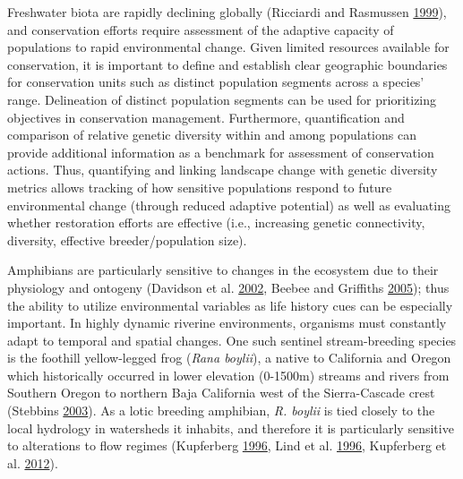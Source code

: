 \documentclass[proquest,12pt,final]{ucthesis-CA2012} %
\begin{document}
\begin{ucmainmatter}
Freshwater biota are rapidly declining globally (Ricciardi and Rasmussen
\protect\hyperlink{ref-ricciardi_extinction_1999}{1999}), and
conservation efforts require assessment of the adaptive capacity of
populations to rapid environmental change. Given limited resources
available for conservation, it is important to define and establish
clear geographic boundaries for conservation units such as distinct
population segments across a species' range. Delineation of distinct
population segments can be used for prioritizing objectives in
conservation management. Furthermore, quantification and comparison of
relative genetic diversity within and among populations can provide
additional information as a benchmark for assessment of conservation
actions. Thus, quantifying and linking landscape change with genetic
diversity metrics allows tracking of how sensitive populations respond
to future environmental change (through reduced adaptive potential) as
well as evaluating whether restoration efforts are effective (i.e.,
increasing genetic connectivity, diversity, effective breeder/population
size).

Amphibians are particularly sensitive to changes in the ecosystem due to
their physiology and ontogeny (Davidson et al.
\protect\hyperlink{ref-davidson_spatial_2002}{2002}, Beebee and
Griffiths \protect\hyperlink{ref-beebee_amphibian_2005}{2005}); thus the
ability to utilize environmental variables as life history cues can be
especially important. In highly dynamic riverine environments, organisms
must constantly adapt to temporal and spatial changes. One such sentinel
stream-breeding species is the foothill yellow-legged frog (\emph{Rana
boylii}), a native to California and Oregon which historically occurred
in lower elevation (0-1500m) streams and rivers from Southern Oregon to
northern Baja California west of the Sierra-Cascade crest (Stebbins
\protect\hyperlink{ref-stebbins_field_2003}{2003}). As a lotic breeding
amphibian, \emph{R. boylii} is tied closely to the local hydrology in
watersheds it inhabits, and therefore it is particularly sensitive to
alterations to flow regimes (Kupferberg
\protect\hyperlink{ref-kupferberg_hydrologic_1996}{1996}, Lind et al.
\protect\hyperlink{ref-lind_effects_1996}{1996}, Kupferberg et al.
\protect\hyperlink{ref-kupferberg_effects_2012}{2012}).


\end{ucmainmatter}
\end{document}
